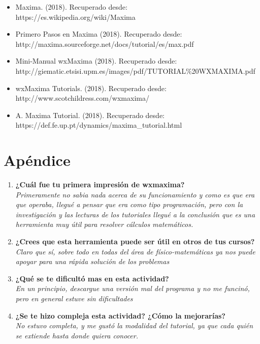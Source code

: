 \documentclass[12pt]{article}
\begin{document}
\begin{itemize}
\item Maxima. (2018). Recuperado desde:\\https://es.wikipedia.org/wiki/Maxima
\item Primero Pasos en Maxima (2018). Recuperado desde:\\http://maxima.sourceforge.net/docs/tutorial/es/max.pdf
\item Mini-Manual wxMaxima (2018). Recuperado desde:\\http://giematic.etsisi.upm.es/images/pdf/TUTORIAL\%20WXMAXIMA.pdf
\item wxMaxima Tutorials. (2018). Recuperado desde:\\ http://www.scotchildress.com/wxmaxima/
\item A. Maxima Tutorial. (2018). Recuperado desde:\\https://def.fe.up.pt/dynamics/maxima\_tutorial.html
\end{itemize}

\section*{Apéndice}
\begin{enumerate}
\item \textbf{¿Cuál fue tu primera impresión de wxmaxima?}\\
\textit{Primeramente no sabia nada acerca de su funcionamiento y como es que era que operaba, llegué a pensar que era como tipo programación, pero con la investigación y las lecturas de los tutoriales llegué a la conclusión que es una herramienta muy útil para resolver cálculos matemáticos.}
\item \textbf{¿Crees que esta herramienta puede ser útil en otros de tus cursos?}\\
\textit{Claro que sí, sobre todo en todas del área de físico-matemáticas ya nos puede apoyar para una rápida solución de los problemas}
\item \textbf{¿Qué se te dificultó mas en esta actividad?}\\
\textit{En un principio, descargue una versión mal del programa y no me funcinó, pero en general estuve sin dificultades}

\item \textbf{¿Se te hizo compleja esta actividad? ¿Cómo la mejorarías? }\\
\textit{No estuvo completa, y me gustó la modalidad del tutorial, ya que cada quién se extiende hasta donde quiera conocer.}
\end{enumerate}
\end{document}
